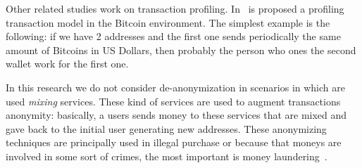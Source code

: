 Other related studies work on transaction profiling. In~\cite{bib:fullDiscl} is
proposed a profiling transaction model in the Bitcoin environment. The
simplest example is the following: if we have 2 addresses and the first one
sends periodically the same amount of Bitcoins in US Dollars, then probably
the person who ones the second wallet work for the first one.

In this research we do not consider de-anonymization in scenarios in which are
used \textit{mixing} services. These kind of services are used to augment
transactions anonymity: basically, a users sends money to these services that
are mixed and gave back to the initial user generating new addresses. These
anonymizing techniques are principally used in illegal purchase or because
that moneys are involved in some sort of crimes, the most important is money
laundering~\cite{bib:laundering}.
